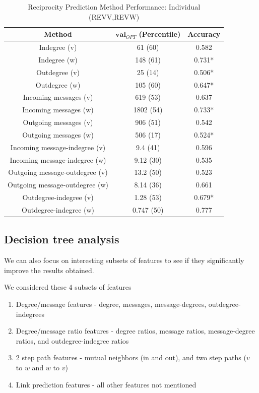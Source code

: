 \documentclass[conference]{IEEEtran}
\begin{document}
\begin{table}[!t]
\renewcommand{\arraystretch}{1.3}
\caption{Reciprocity Prediction Method Performance: Individual (REVV,REVW)}
\label{table_recresults_indivVW}
\centering
\begin{tabular}{|c||c|c|}
\hline
\bf{Method} & $\mathbf{val}_{OPT}$ (Percentile) & \bf{Accuracy} \\
\hline
Indegree (v) &  61 (60) & 0.582 \\
Indegree (w) & 148 (61) & 0.731* \\
Outdegree (v) & 25 (14) & 0.506* \\
Outdegree (w) & 105 (60) & 0.647* \\
\hline
Incoming messages (v) & 619 (53) & 0.637 \\
Incoming messages (w) & 1802 (54) & 0.733* \\
Outgoing messages (v) & 906 (51) & 0.542 \\
Outgoing messages (w) & 506 (17) & 0.524* \\
\hline
Incoming message-indegree (v) & 9.4 (41) & 0.596 \\
Incoming message-indegree (w) & 9.12 (30) & 0.535 \\
Outgoing message-outdegree (v) & 13.2 (50) & 0.523 \\
Outgoing message-outdegree (w) & 8.14 (36) & 0.661 \\
\hline
Outdegree-indegree (v) & 1.28 (53) & 0.679* \\
Outdegree-indegree (w) & 0.747 (50) & 0.777 \\
\hline
\end{tabular}
\end{table}

\subsection{Decision tree analysis}
We can also focus on interesting subsets of features to see if they significantly improve the results obtained.

We considered these 4 subsets of features
\begin{enumerate}
	\item Degree/message features - degree, messages, message-degrees, outdegree-indegrees
	\item Degree/message ratio features - degree ratios, message ratios, message-degree ratios, and outdegree-indegree ratios
	\item 2 step path features - mutual neighbors (in and out), and two step paths ($v$ to $w$ and $w$ to $v$)
	\item Link prediction features - all other features not mentioned
\end{enumerate}
\end{document}
